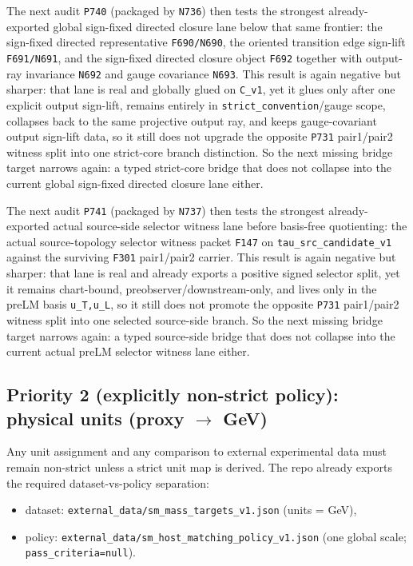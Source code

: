 \documentclass[11pt,a4paper]{article}
\begin{document}
The next audit \texttt{P740} (packaged by \texttt{N736}) then tests the strongest already-exported global sign-fixed directed closure lane
below that same frontier: the sign-fixed directed representative \texttt{F690/N690}, the oriented transition edge sign-lift \texttt{F691/N691},
and the sign-fixed directed closure object \texttt{F692} together with output-ray invariance \texttt{N692} and gauge covariance \texttt{N693}.
This result is again negative but sharper:
that lane is real and globally glued on \texttt{C\_v1}, yet it glues only after one explicit output sign-lift,
remains entirely in \texttt{strict\_convention}/gauge scope, collapses back to the same projective output ray,
and keeps gauge-covariant output sign-lift data,
so it still does not upgrade the opposite \texttt{P731} pair1/pair2 witness split into one strict-core branch distinction.
So the next missing bridge target narrows again:
a typed strict-core bridge that does not collapse into the current global sign-fixed directed closure lane either.

The next audit \texttt{P741} (packaged by \texttt{N737}) then tests the strongest already-exported actual source-side selector witness lane
before basis-free quotienting: the actual source-topology selector witness packet \texttt{F147} on \texttt{tau\_src\_candidate\_v1}
against the surviving \texttt{F301} pair1/pair2 carrier.
This result is again negative but sharper:
that lane is real and already exports a positive signed selector split,
yet it remains chart-bound, preobserver/downstream-only, and lives only in the preLM basis \texttt{u\_T,u\_L},
so it still does not promote the opposite \texttt{P731} pair1/pair2 witness split into one selected source-side branch.
So the next missing bridge target narrows again:
a typed source-side bridge that does not collapse into the current actual preLM selector witness lane either.

\subsection*{Priority 2 (explicitly non-strict policy): physical units (proxy $\to$ GeV)}

Any unit assignment and any comparison to external experimental data must remain non-strict unless a strict unit map is derived.
The repo already exports the required dataset-vs-policy separation:
\begin{itemize}
  \item dataset: \texttt{external\_data/sm\_mass\_targets\_v1.json} (units = GeV),
  \item policy: \texttt{external\_data/sm\_host\_matching\_policy\_v1.json} (one global scale; \texttt{pass\_criteria=null}).
\end{itemize}
\end{document}
